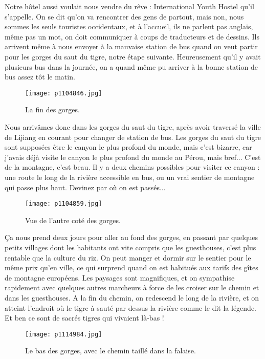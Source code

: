 \documentclass{book}
\begin{document}
Notre hôtel aussi voulait nous vendre du rêve : International Youth Hostel qu'il s'appelle. On se dit qu'on va rencontrer des gens de partout, mais non, nous sommes les seuls touristes occidentaux, et à l'accueil, ils ne parlent pas anglais, même pas un mot, on doit communiquer à coups de traducteurs et de dessins. Ils arrivent même à nous envoyer à la mauvaise station de bus quand on veut partir pour les gorges du saut du tigre, notre étape suivante. Heureusement qu'il y avait plusieurs bus dans la journée, on a quand même pu arriver à la bonne station de bus assez tôt le matin.


\begin{figure}[h]
\centering
\texttt{[image: p1104846.jpg]}
\caption*{La fin des gorges.}
\end{figure}



Nous arrivâmes donc dans les gorges du saut du tigre, après avoir traversé la ville de Lijiang en courant pour changer de station de bus. Les gorges du saut du tigre sont supposées être le canyon le plus profond du monde, mais c'est bizarre, car j'avais déjà visite le canyon le plus profond du monde au Pérou, mais bref... C'est de la montagne, c'est beau. Il y a deux chemins possibles pour visiter ce canyon : une route le long de la rivière accessible en bus, ou un vrai sentier de montagne qui passe plus haut. Devinez par où on est passés...


\begin{figure}[h]
\centering
\texttt{[image: p1104859.jpg]}
\caption*{Vue de l'autre coté des gorges.}
\end{figure}

Ça nous prend deux jours pour aller au fond des gorges, en passant par quelques petits villages dont les habitants ont vite compris que les guesthouses, c'est plus rentable que la culture du riz. On peut manger et dormir sur le sentier pour le même prix qu'en ville, ce qui surprend quand on est habitués aux tarifs des gîtes de montagne européens. Les paysages sont magnifiques, et on sympathise rapidement avec quelques autres marcheurs à force de les croiser sur le chemin et dans les guesthouses.
A la fin du chemin, on redescend le long de la rivière, et on atteint l'endroit où le tigre à sauté par dessus la rivière comme le dit la légende. Et ben ce sont de sacrés tigres qui vivaient là-bas !


\begin{figure}[h]
\centering
\texttt{[image: p1114984.jpg]}
\caption*{Le bas des gorges, avec le chemin taillé dans la falaise.}
\end{figure}
\end{document}
